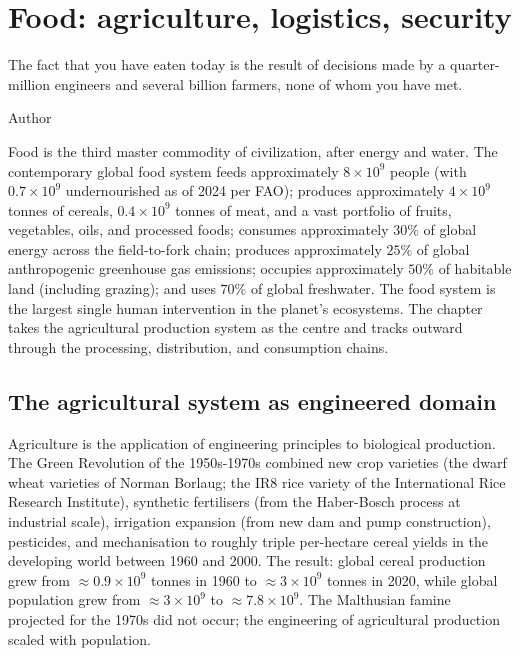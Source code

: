 \chapter{Food: agriculture, logistics, security}
\label{vol12:ch05}

\epigraph{The fact that you have eaten today is the result of decisions made by a quarter-million engineers and several billion farmers, none of whom you have met.}{Author}


\noindent
Food is the third master commodity of civilization, after energy and water. The contemporary global food system feeds approximately $8 \times 10^9$ people (with $0.7 \times 10^9$ undernourished as of 2024 per FAO); produces approximately $4 \times 10^9$ tonnes of cereals, $0.4 \times 10^9$ tonnes of meat, and a vast portfolio of fruits, vegetables, oils, and processed foods; consumes approximately $30\%$ of global energy across the field-to-fork chain; produces approximately $25\%$ of global anthropogenic greenhouse gas emissions; occupies approximately $50\%$ of habitable land (including grazing); and uses $70\%$ of global freshwater. The food system is the largest single human intervention in the planet's ecosystems. The chapter takes the agricultural production system as the centre and tracks outward through the processing, distribution, and consumption chains.

\section{The agricultural system as engineered domain}

Agriculture is the application of engineering principles to biological production. The Green Revolution of the 1950s-1970s combined new crop varieties (the dwarf wheat varieties of Norman Borlaug; the IR8 rice variety of the International Rice Research Institute), synthetic fertilisers (from the Haber-Bosch process at industrial scale), irrigation expansion (from new dam and pump construction), pesticides, and mechanisation to roughly triple per-hectare cereal yields in the developing world between 1960 and 2000. The result: global cereal production grew from $\approx 0.9 \times 10^9$ tonnes in 1960 to $\approx 3 \times 10^9$ tonnes in 2020, while global population grew from $\approx 3 \times 10^9$ to $\approx 7.8 \times 10^9$. The Malthusian famine projected for the 1970s did not occur; the engineering of agricultural production scaled with population.

